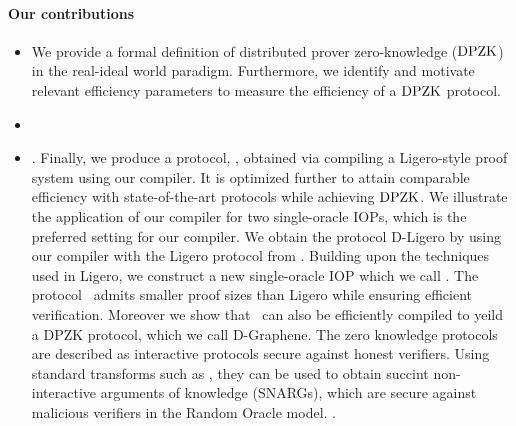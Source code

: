 \paragraph*{Our contributions}
\begin{itemize}
	\item We provide a formal definition of distributed prover zero-knowledge ($\text{DPZK}$) in the real-ideal world paradigm. Furthermore, we identify and motivate relevant efficiency parameters to measure the efficiency of a $\text{DPZK}$ protocol. %
	\item {}
	\item {}.
	{\color{brown}
	Finally, we produce a protocol, \name,  obtained via compiling a Ligero-style proof system using our compiler. 
	It is optimized further to attain comparable efficiency with state-of-the-art protocols while achieving $\text{DPZK}$.
	}
	{\color{blue} We illustrate the application of our compiler for two single-oracle IOPs, which is the preferred setting for our compiler.
	We obtain the protocol \textsf{D-Ligero} by using our compiler with the Ligero protocol from \cite{ligero}. Building upon the techniques
	used in Ligero, we construct a new single-oracle IOP which we call \name. The protocol \name\ admits smaller proof sizes
	than Ligero while ensuring efficient verification. Moreover we show that \name\ can also be efficiently compiled to yeild a DPZK protocol, 
	which we call D-Graphene. The zero knowledge protocols are described as interactive protocols secure against honest verifiers. Using standard
	transforms such as \cite{FS86, BCS16}, they can be used to obtain succint non-interactive arguments of knowledge (SNARGs), 
	which are secure against malicious verifiers in the Random Oracle model.
	}
	.
	{\color{brown}
}
\end{itemize}

